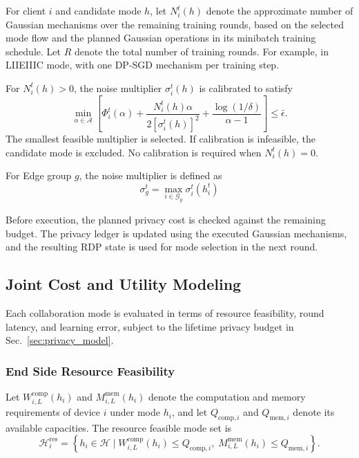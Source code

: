 \documentclass[5p,times]{elsarticle}
\theoremstyle{plain}
\theoremstyle{definition}
\theoremstyle{remark}
\begin{document}
For client \(i\) and candidate mode \(h\),
let \(N_i^t(h)\) denote the approximate
number of Gaussian mechanisms over the
remaining training rounds, based on the selected mode flow and
the planned Gaussian operations in
its minibatch training schedule.
Let \(R\) denote the total number of
training rounds. For example, in LIIEIIIC mode,
with one DP-SGD mechanism per training step.

For \(N_i^t(h)>0\), the noise multiplier
\(\sigma_i^t(h)\) is calibrated to satisfy
\begin{equation}
\min_{\alpha\in\mathcal A}
\left[
\Phi_i^t(\alpha)
+
\frac{N_i^t(h)\alpha}
{2[\sigma_i^t(h)]^2}
+
\frac{\log(1/\delta)}{\alpha-1}
\right]
\leq\bar{\epsilon}.
\label{eq:noise_calibration}
\end{equation}
The smallest feasible multiplier is selected.
If calibration is infeasible, the candidate
mode is excluded. No calibration is required
when \(N_i^t(h)=0\).

For Edge group \(g\), the noise multiplier
is defined as
\begin{equation}
\sigma_g^t=\max_{i\in\mathcal G_g}\sigma_i^t(h_i^t)
\end{equation}

Before execution, the planned privacy cost
is checked against the remaining budget.
The privacy ledger is updated using the
executed Gaussian mechanisms, and the resulting
RDP state is used for mode selection in
the next round.
\subsection{Joint Cost and Utility Modeling}
\label{sec:cost_utility_model}
Each collaboration mode is evaluated in terms
of resource feasibility, round latency, and
learning error, subject to the lifetime
privacy budget in Sec.~\ref{sec:privacy_model}.
\subsubsection{End Side Resource Feasibility}
\label{sec:end_resource}

Let \(W_{i,L}^{\mathrm{comp}}(h_i)\) and
\(M_{i,L}^{\mathrm{mem}}(h_i)\) denote the
computation and memory requirements of
device \(i\) under mode \(h_i\), and let
\(Q_{\mathrm{comp},i}\) and \(Q_{\mathrm{mem},i}\)
denote its available capacities.
The resource feasible mode set is
\begin{equation}
\mathcal H_i^{\mathrm{res}}
=
\left\{
h_i\in\mathcal H
\mid
W_{i,L}^{\mathrm{comp}}(h_i)\le Q_{\mathrm{comp},i},
\;
M_{i,L}^{\mathrm{mem}}(h_i)\le Q_{\mathrm{mem},i}
\right\}.
\label{eq:resource_feasible}
\end{equation}
\end{document}
